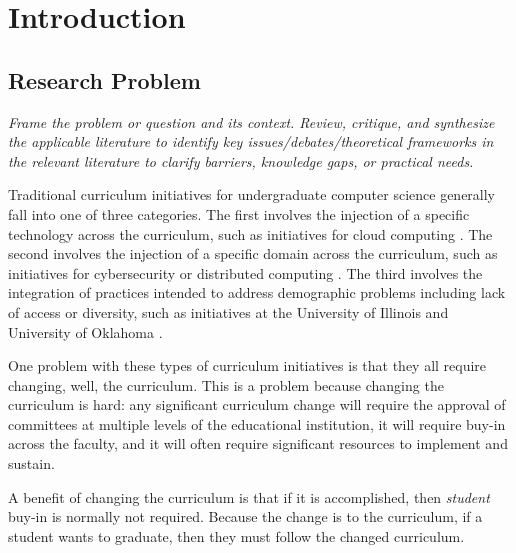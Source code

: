 \documentclass[acmsmall]{acmart}
\begin{document}


\maketitle

\section{Introduction}

\subsection{Research Problem}
{\em\small Frame the problem or question and its context. Review, critique, and synthesize the applicable literature to identify key issues/debates/theoretical frameworks in the relevant literature to clarify barriers, knowledge gaps, or practical needs.}

Traditional curriculum initiatives for undergraduate computer science generally fall into one of three categories. The first involves the injection of a specific technology across the curriculum, such as initiatives for cloud computing \cite{deb_module-based_2019}. The second involves the injection of a specific domain across the curriculum, such as initiatives for cybersecurity \cite{tang_shaping_2019} or distributed computing \cite{abebe_watdfs:_2019}. The third involves the integration of practices intended to address demographic problems including lack of access or diversity, such as initiatives at the University of Illinois \cite{metcalf_diversity_2018} and University of Oklahoma \cite{collain_you_2019}.

One problem with these types of curriculum initiatives is that they all require changing, well, the curriculum.  This is a problem because changing the curriculum is hard: any significant curriculum change will require the approval of committees at multiple levels of the educational institution, it will require buy-in across the faculty, and it will often require significant resources to implement and sustain.

A benefit of changing the curriculum is that if it is accomplished, then {\em student} buy-in is normally not required. Because the change is to the curriculum, if a student wants to graduate, then they must follow the changed curriculum.
\end{document}
